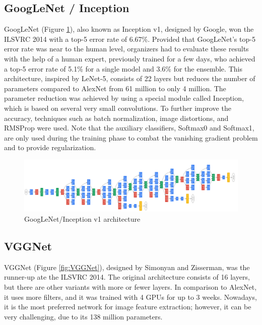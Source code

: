 \subsection{GoogLeNet / Inception}
GoogLeNet \cite{Going-Deeper-with-Convolutions} (Figure \ref{fig:GoogLeNet}), also known as Inception v1, designed by Google, won the ILSVRC 2014 with a top-5 error rate of 6.67\%. Provided that GoogLe\-Net's top-5 error rate was near to the human level, organizers had to evaluate these results with the help of a human expert, previously trained for a few days, who achieved a top-5 error rate of 5.1\% for a single model and 3.6\% for the ensemble. This architecture, inspired by LeNet-5, consists of 22 layers but reduces the number of parameters compared to AlexNet from 61 million to only 4 million. The parameter reduction was achieved by using a special module called Inception, which is based on several very small convolutions. To further improve the accuracy, techniques such as batch normalization, image distortions, and RMSProp were used. Note that the auxiliary classifiers, Softmax0 and Softmax1, are only used during the training phase to combat the vanishing gradient problem and to provide regularization.

\begin{figure} [H]
	\centering
	\includegraphics[width=\textwidth]{Images/CNNArchitectures/GoogLeNet.png}
	\decoRule
	\caption[GoogLeNet/Inception v1 architecture]{GoogLeNet/Inception v1 architecture}
	\label{fig:GoogLeNet}
\end{figure}

\subsection{VGGNet}
VGGNet \cite{Very-Deep-Convolutional-Networks-for-Large-Scale-Image-Recognition} (Figure \ref{fig:VGGNet}), designed by Simonyan and Zisserman, was the runner-up ate the ILSVRC 2014. The original architecture consists of 16 layers, but there are other variants with more or fewer layers. In comparison to AlexNet, it uses more filters, and it was trained with 4 GPUs for up to 3 weeks. Nowadays, it is the most preferred network for image feature extraction; however, it can be very challenging, due to its 138 million parameters.

